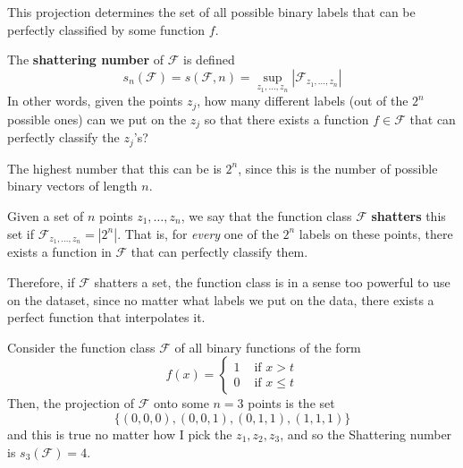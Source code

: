   This projection determines the set of all possible binary labels that can be perfectly classified by some function $f$. 

  \begin{definition}
    The \textbf{shattering number} of $\mathcal{F}$ is defined 
    \begin{equation}
      s_n (\mathcal{F}) = s(\mathcal{F}, n) = \sup_{z_1, \ldots, z_n} |\mathcal{F}_{z_1, \ldots, z_n}|
    \end{equation}
    In other words, given the points $z_j$, how many different labels (out of the $2^n$ possible ones) can we put on the $z_j$ so that there exists a function $f \in \mathcal{F}$ that can perfectly classify the $z_j$'s? 
  \end{definition}

  The highest number that this can be is $2^n$, since this is the number of possible binary vectors of length $n$. 

  \begin{definition}
    Given a set of $n$ points $z_1, \ldots, z_n$, we say that the function class $\mathcal{F}$ \textbf{shatters} this set if $\mathcal{F}_{z_1, \ldots, z_n} = |2^n|$. That is, for \textit{every} one of the $2^n$ labels on these points, there exists a function in $\mathcal{F}$ that can perfectly classify them. 
  \end{definition}

  Therefore, if $\mathcal{F}$ shatters a set, the function class is in a sense too powerful to use on the dataset, since no matter what labels we put on the data, there exists a perfect function that interpolates it. 

  \begin{example}
    Consider the function class $\mathcal{F}$ of all binary functions of the form 
    \begin{equation}
      f(x) = \begin{cases} 1 & \text{ if } x > t \\
        0 & \text{ if } x \leq t \end{cases} 
    \end{equation}
    Then, the projection of $\mathcal{F}$ onto some $n = 3$ points is the set 
    \begin{equation}
      \{ (0, 0, 0), (0, 0, 1), (0, 1, 1), (1, 1, 1) \}
    \end{equation}
    and this is true no matter how I pick the $z_1, z_2, z_3$, and so the Shattering number is $s_3 (\mathcal{F}) = 4$. 
  \end{example}

